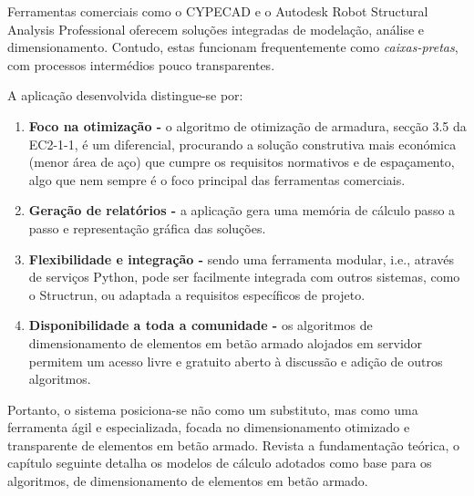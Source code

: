 
Ferramentas comerciais como o CYPECAD \cite{CYPECAD} e o Autodesk Robot Structural Analysis Professional \cite{RobotManual} oferecem soluções integradas de modelação, análise e dimensionamento. 
Contudo, estas funcionam frequentemente como \emph{caixas-pretas}, com processos intermédios pouco transparentes. 

A aplicação desenvolvida distingue-se por:
\begin{enumerate}
    \item \textbf{Foco na otimização -} o algoritmo de otimização de armadura, secção 3.5 da EC2-1-1, é um diferencial, procurando a solução construtiva mais económica (menor área de aço) que cumpre os requisitos normativos e de espaçamento, algo que nem sempre é o foco principal das ferramentas comerciais.
    \item \textbf{Geração de relatórios -} a aplicação gera uma memória de cálculo passo a passo e representação gráfica das soluções.
    \item \textbf{Flexibilidade e integração -} sendo uma ferramenta modular, i.e., através de serviços Python, pode ser facilmente integrada com outros sistemas, como o Structrun, ou adaptada a requisitos específicos de projeto.
    \item \textbf{Disponibilidade a toda a comunidade -} os algoritmos de dimensionamento de elementos em betão armado alojados em servidor permitem um acesso livre e gratuito aberto à discussão e adição de outros algoritmos.
\end{enumerate}

Portanto, o sistema posiciona-se não como um substituto, mas como uma ferramenta ágil e especializada, focada no dimensionamento otimizado e transparente de elementos em betão armado.
Revista a fundamentação teórica, o capítulo seguinte detalha os modelos de cálculo adotados como base para os algoritmos, de dimensionamento de elementos em betão armado.
